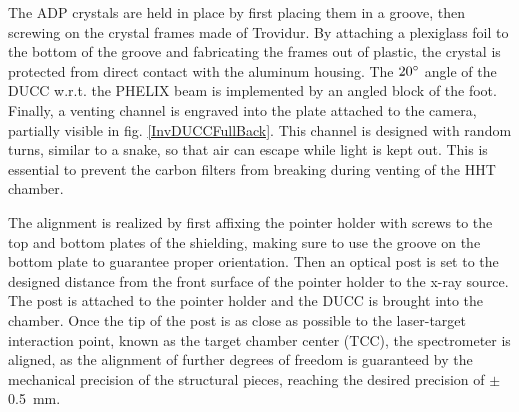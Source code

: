 The ADP crystals are held in place by first placing them in a 
groove, 
then screwing on the crystal frames made of Trovidur. By 
attaching a 
plexiglass foil to the bottom of the groove and fabricating the 
frames 
out of plastic, the crystal is protected from direct contact with 
the 
aluminum housing. The $20\degree$ angle of the DUCC w.r.t. the 
PHELIX 
beam is implemented by an angled block of the foot. Finally, a 
venting 
channel is engraved into the plate attached to the camera, 
partially 
visible in fig. \ref{InvDUCCFullBack}. This channel is designed 
with 
random turns, similar to a snake, so that air can escape while 
light is 
kept out. This is essential to prevent the carbon filters from 
breaking 
during venting of the HHT chamber.


The alignment is realized by first affixing the pointer holder 
with 
screws to 
the top and bottom plates of the shielding, making sure to use 
the 
groove on 
the bottom plate to guarantee proper orientation. Then an optical 
post 
is set 
to the designed distance from the front surface of the pointer 
holder 
to the 
x-ray source. The post is attached to the pointer holder and the 
DUCC 
is brought into 
the chamber. Once the tip of the post is as close as possible to 
the 
laser-target interaction point, known as the target chamber 
center 
(TCC), the spectrometer is aligned, as the alignment of 
further degrees of freedom
is guaranteed by the mechanical precision of the structural 
pieces, reaching the desired precision of $\pm$\SI{0.5}{\milli\meter}.

